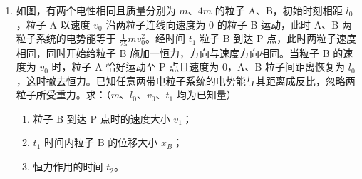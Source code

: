 \documentclass[\gkver]{gaokaozhenti}
\begin{document}
\begin{enumerate}
{根据洛伦兹力提供向心力可得 $e\frac{B_{0}}{2}v_{x} = \frac{mv_{x}^{2}}{R_{0}}$

联立解得 $v_{x} = \frac{v_{0}}{2}$

由射出到相切，经过半个周期，用时 $t = \frac{T}{2} = \frac{1}{2} \times \frac{2\pi m}{e\frac{B_{0}}{2}} = \frac{2\pi m}{eB_{0}} = \frac{\pi R}{v_{0}}$

根据速度的合成与分解可知 $v_{y} = \sqrt{v_{0}^{2} - v_{x}^{2}} = \frac{\sqrt{3}}{2}v_{0}$

平行轴线方向运动距离 $y = v_{y}t = \frac{\sqrt{3}\pi}{2}R$

结合对称性，被电子击中的面积 $S = 2 \times 2\pi Ry = 2\sqrt{3}\pi^{2}R^{2}$
}

\item
如图，有两个电性相同且质量分别为 $m$、$4m$ 的粒子 A、B，初始时刻相距 $l_{0}$，粒子 A 以速度 $v_{0}$ 沿两粒子连线向速度为 $0$ 的粒子 B 运动，此时 A、B 两粒子系统的电势能等于 $\frac{1}{25}mv_{0}^{2}$。经时间 $t_{1}$ 粒子 B 到达 P 点，此时两粒子速度相同，同时开始给粒子 B 施加一恒力，方向与速度方向相同。当粒子 B 的速度为 $v_{0}$ 时，粒子 A 恰好运动至 P 点且速度为 $0$，A、B 粒子间距离恢复为 $l_{0}$，这时撤去恒力。已知任意两带电粒子系统的电势能与其距离成反比，忽略两粒子所受重力。求：（$m$、$l_{0}$、$v_{0}$、$t_{1}$ 均为已知量）
\begin{enumerate}
	\item
	粒子 B 到达 P 点时的速度大小 $v_{1}$；
	\item
	$t_{1}$ 时间内粒子 B 的位移大小 $x_{B}$；
	\item
	恒力作用的时间 $t_{2}$。
\end{enumerate}
\onepicture[align=right, w=7.00cm]{}
\end{enumerate}
\end{document}
